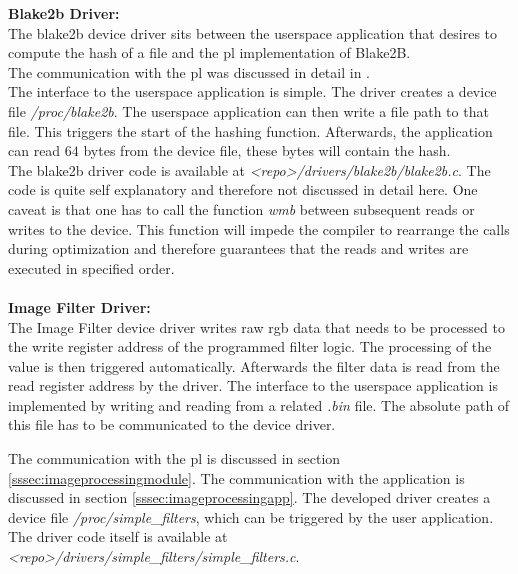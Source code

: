 
\textbf{Blake2b Driver:}\\
The blake2b device driver sits between the userspace application that desires to
compute the hash of a file and the \gls{pl} implementation of Blake2B.\\
The communication with the \gls{pl} was discussed in detail in
.\\
The interface to the userspace application is simple.
The driver creates a device file \emph{/proc/blake2b}.
The userspace application can then write a file path to that file.
This triggers the start of the hashing function.
Afterwards, the application can read $64$ bytes from the device file, these
bytes will contain the hash.\\
The blake2b driver code is available at \emph{<repo>/drivers/blake2b/blake2b.c}.
The code is quite self explanatory and therefore not discussed in detail here.
One caveat is that one has to call the function \emph{wmb} between subsequent
reads or writes to the device.
This function will impede the compiler to rearrange the calls during
optimization and therefore guarantees that the reads and writes are executed in
specified order.
\\\\
\textbf{Image Filter Driver:}\\
The Image Filter device driver writes raw \gls{rgb} data that needs to be
processed to the write register address of the programmed filter logic.
The processing of the value is then triggered automatically.
Afterwards the filter data is read from the read register address by the driver.
The interface to the userspace application is implemented by writing and reading
from a related \emph{.bin} file.
The absolute path of this file has to be communicated to the device driver.

The communication with the \gls{pl} is discussed in section
\ref{sssec:imageprocessingmodule}.
The communication with the application is discussed in section
\ref{sssec:imageprocessingapp}.
The developed driver creates a device file \emph{/proc/simple\_filters}, which
can be triggered by the user application.
The driver code itself is available at\\
\emph{<repo>/drivers/simple\_filters/simple\_filters.c}.
